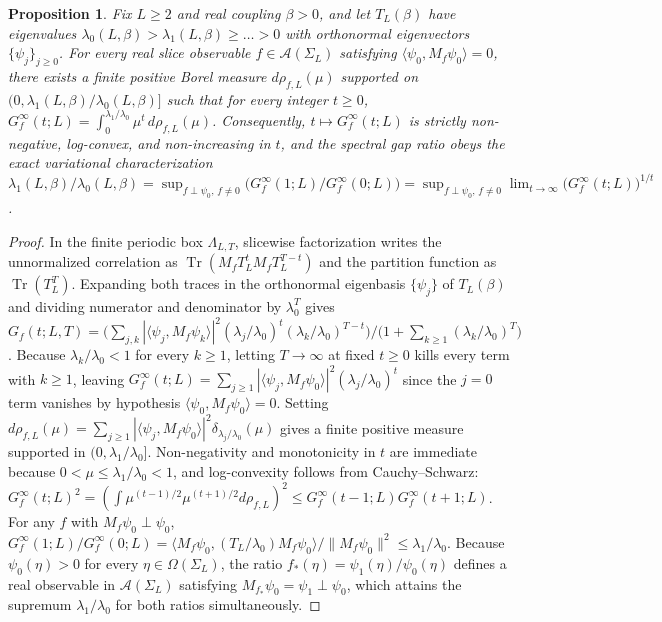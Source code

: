 \documentclass[11pt]{article}
\newtheorem{proposition}[theorem]{Proposition}
\theoremstyle{definition}
\begin{document}
\begin{proposition}
\label{prop:s06-spectral}
Fix $L \ge 2$ and real coupling $\beta > 0$, and let $T_L(\beta)$ have eigenvalues
$\lambda_0(L, \beta) > \lambda_1(L, \beta) \ge \dots > 0$ with orthonormal
eigenvectors $\{\psi_j\}_{j \ge 0}$. For every real slice observable $f \in
\mathcal{A}(\Sigma_L)$ satisfying $\langle \psi_0, M_f \psi_0 \rangle = 0$, there
exists a finite positive Borel measure $d\rho_{f, L}(\mu)$ supported on $(0,
\lambda_1(L, \beta) / \lambda_0(L, \beta)]$ such that for every integer $t \ge 0$,
$G_f^\infty(t; L) = \int_0^{\lambda_1 / \lambda_0} \mu^t \, d\rho_{f, L}(\mu)$.
Consequently, $t \mapsto G_f^\infty(t; L)$ is strictly non-negative, log-convex, and
non-increasing in $t$, and the spectral gap ratio obeys the exact variational
characterization $\lambda_1(L, \beta) / \lambda_0(L, \beta) = \sup_{f \perp
\psi_0,\, f \neq 0} \bigl(G_f^\infty(1; L) / G_f^\infty(0; L)\bigr) = \sup_{f \perp
\psi_0,\, f \neq 0} \lim_{t \to \infty} \bigl(G_f^\infty(t; L)\bigr)^{1/t}$.
\end{proposition}
\begin{proof}
In the finite periodic box $\Lambda_{L,T}$, slicewise factorization writes the
unnormalized correlation as $\operatorname{Tr}(M_f T_L^t M_f T_L^{T-t})$ and the
partition function as $\operatorname{Tr}(T_L^T)$. Expanding both traces in the
orthonormal eigenbasis $\{\psi_j\}$ of $T_L(\beta)$ and dividing numerator and
denominator by $\lambda_0^T$ gives $G_f(t; L, T) = \bigl(\sum_{j, k} |\langle
\psi_j, M_f \psi_k \rangle|^2 (\lambda_j / \lambda_0)^t (\lambda_k /
\lambda_0)^{T-t}\bigr) / \bigl(1 + \sum_{k \ge 1} (\lambda_k / \lambda_0)^T\bigr)$.
Because $\lambda_k / \lambda_0 < 1$ for every $k \ge 1$, letting $T \to \infty$ at
fixed $t \ge 0$ kills every term with $k \ge 1$, leaving $G_f^\infty(t; L) = \sum_{j
\ge 1} |\langle \psi_j, M_f \psi_0 \rangle|^2 (\lambda_j / \lambda_0)^t$ since the
$j = 0$ term vanishes by hypothesis $\langle \psi_0, M_f \psi_0 \rangle = 0$.
Setting $d\rho_{f, L}(\mu) = \sum_{j \ge 1} |\langle \psi_j, M_f \psi_0 \rangle|^2
\delta_{\lambda_j / \lambda_0}(\mu)$ gives a finite positive measure supported in
$(0, \lambda_1 / \lambda_0]$. Non-negativity and monotonicity in $t$ are immediate
because $0 < \mu \le \lambda_1/\lambda_0 < 1$, and log-convexity follows from
Cauchy--Schwarz: $G_f^\infty(t; L)^2 = (\int \mu^{(t-1)/2} \mu^{(t+1)/2}
d\rho_{f,L})^2 \le G_f^\infty(t-1; L) G_f^\infty(t+1; L)$. For any $f$ with $M_f
\psi_0 \perp \psi_0$, $G_f^\infty(1; L) / G_f^\infty(0; L) = \langle M_f \psi_0,
(T_L / \lambda_0) M_f \psi_0 \rangle / \|M_f \psi_0\|^2 \le \lambda_1 / \lambda_0$.
Because $\psi_0(\eta) > 0$ for every $\eta \in \Omega(\Sigma_L)$, the ratio
$f_*(\eta) = \psi_1(\eta) / \psi_0(\eta)$ defines a real observable in
$\mathcal{A}(\Sigma_L)$ satisfying $M_{f_*} \psi_0 = \psi_1 \perp \psi_0$, which
attains the supremum $\lambda_1 / \lambda_0$ for both ratios simultaneously.
\end{proof}
\end{document}
